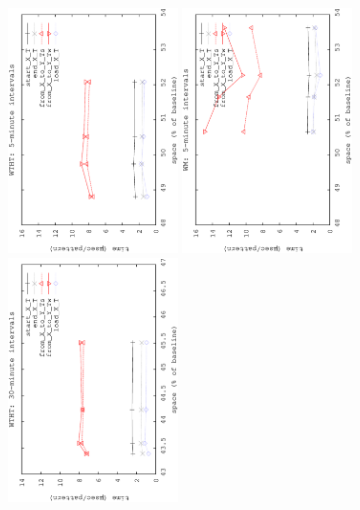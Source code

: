 	\begin{figure}[ht]
		\begin{center}
			{\includegraphics[angle=-90,width=0.4\textwidth]{figures_synt/porto_ht5.eps}}
			{\includegraphics[angle=-90,width=0.4\textwidth]{figures_synt/porto_wm5.eps}}
			{\includegraphics[angle=-90,width=0.4\textwidth]{figures_synt/porto_ht30.eps}}

\end{center}
\end{figure}
